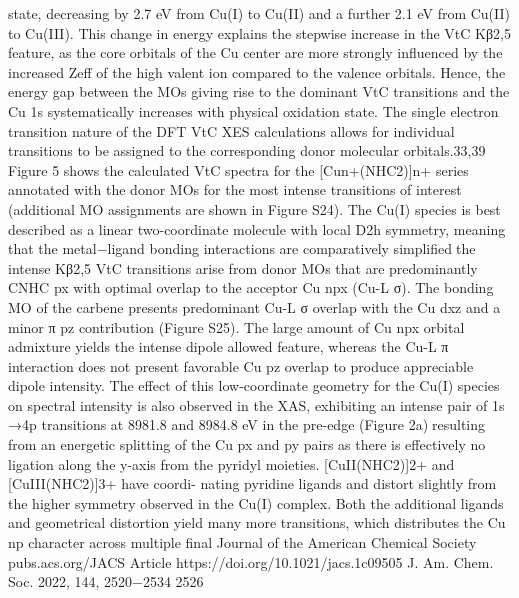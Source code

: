 \documentclass{article}
\begin{document}
state, decreasing by 2.7 eV from Cu(I) to Cu(II) and a further
2.1 eV from Cu(II) to Cu(III). This change in energy explains
the stepwise increase in the VtC Kβ2,5 feature, as the core
orbitals of the Cu center are more strongly inﬂuenced by the
increased Zeff of the high valent ion compared to the valence
orbitals. Hence, the energy gap between the MOs giving rise to
the dominant VtC transitions and the Cu 1s systematically
increases with physical oxidation state.
The single electron transition nature of the DFT VtC XES
calculations allows for individual transitions to be assigned to
the corresponding donor molecular orbitals.33,39 Figure 5
shows the calculated VtC spectra for the [Cun+(NHC2)]n+
series annotated with the donor MOs for the most intense
transitions of interest (additional MO assignments are shown
in Figure S24). The Cu(I) species is best described as a linear
two-coordinate molecule with local D2h symmetry, meaning
that the metal−ligand bonding interactions are comparatively
simpliﬁedthe intense Kβ2,5 VtC transitions arise from donor
MOs that are predominantly CNHC px with optimal overlap to
the acceptor Cu npx (Cu-L σ). The bonding MO of the
carbene presents predominant Cu-L σ overlap with the Cu dxz
and a minor π pz contribution (Figure S25). The large amount
of Cu npx orbital admixture yields the intense dipole allowed
feature, whereas the Cu-L π interaction does not present
favorable Cu pz overlap to produce appreciable dipole
intensity. The eﬀect of this low-coordinate geometry for the
Cu(I) species on spectral intensity is also observed in the XAS,
exhibiting an intense pair of 1s →4p transitions at 8981.8 and
8984.8 eV in the pre-edge (Figure 2a)resulting from an
energetic splitting of the Cu px and py pairs as there is
eﬀectively no ligation along the y-axis from the pyridyl
moieties. [CuII(NHC2)]2+ and [CuIII(NHC2)]3+ have coordi-
nating pyridine ligands and distort slightly from the higher
symmetry observed in the Cu(I) complex. Both the additional
ligands and geometrical distortion yield many more transitions,
which distributes the Cu np character across multiple ﬁnal
Journal of the American Chemical Society
pubs.acs.org/JACS
Article
https://doi.org/10.1021/jacs.1c09505
J. Am. Chem. Soc. 2022, 144, 2520−2534
2526

\newpage

\end{document}
